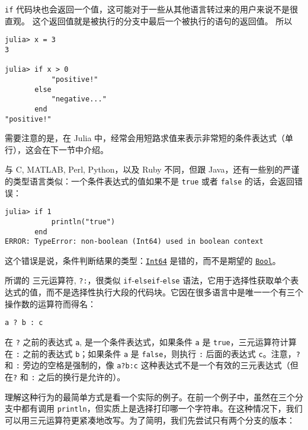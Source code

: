 \texttt{if} 代码块也会返回一个值，这可能对于一些从其他语言转过来的用户来说不是很直观。 这个返回值就是被执行的分支中最后一个被执行的语句的返回值。 所以




\begin{verbatim}
julia> x = 3
3

julia> if x > 0
           "positive!"
       else
           "negative..."
       end
"positive!"
\end{verbatim}



需要注意的是，在 Julia 中，经常会用短路求值来表示非常短的条件表达式（单行），这会在下一节中介绍。



与 C, MATLAB, Perl, Python，以及 Ruby 不同，但跟 Java，还有一些别的严谨的类型语言类似：一个条件表达式的值如果不是 \texttt{true} 或者 \texttt{false} 的话，会返回错误：




\begin{verbatim}
julia> if 1
           println("true")
       end
ERROR: TypeError: non-boolean (Int64) used in boolean context
\end{verbatim}



这个错误是说，条件判断结果的类型：\hyperlink{7720564657383125058}{\texttt{Int64}} 是错的，而不是期望的 \hyperlink{46725311238864537}{\texttt{Bool}}。



所谓的 {\textquotedbl}三元运算符{\textquotedbl}, \texttt{?:}，很类似 \texttt{if}-\texttt{elseif}-\texttt{else} 语法，它用于选择性获取单个表达式的值，而不是选择性执行大段的代码块。它因在很多语言中是唯一一个有三个操作数的运算符而得名：




\begin{verbatim}
a ? b : c
\end{verbatim}



在 \texttt{?} 之前的表达式 \texttt{a}, 是一个条件表达式，如果条件 \texttt{a} 是 \texttt{true}，三元运算符计算在 \texttt{:} 之前的表达式 \texttt{b}；如果条件 \texttt{a} 是 \texttt{false}，则执行 \texttt{:} 后面的表达式 \texttt{c}。注意，\texttt{?} 和 \texttt{:} 旁边的空格是强制的，像 \texttt{a?b:c} 这种表达式不是一个有效的三元表达式（但在\texttt{?} 和 \texttt{:} 之后的换行是允许的）。



理解这种行为的最简单方式是看一个实际的例子。在前一个例子中，虽然在三个分支中都有调用 \texttt{println}，但实质上是选择打印哪一个字符串。在这种情况下，我们可以用三元运算符更紧凑地改写。为了简明，我们先尝试只有两个分支的版本：




